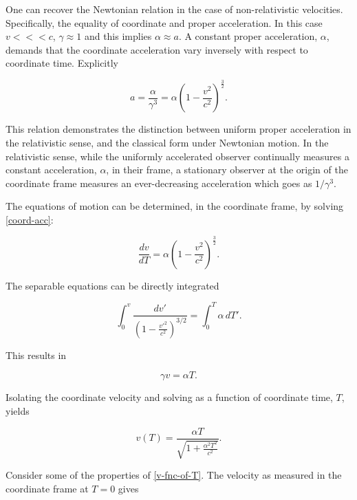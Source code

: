 \documentclass[11pt]{article}
\begin{document}
One can recover the Newtonian relation in the case of non-relativistic velocities. Specifically, the equality of coordinate and proper acceleration. In this case $v <<< c$, $\gamma \approx 1$ and this implies $\alpha \approx a$. A constant proper acceleration, $\alpha$, demands that the coordinate acceleration vary inversely with respect to coordinate time. Explicitly

\begin{equation}
    \label{coord-acc}
    a = \frac{\alpha}{\gamma^3} = \alpha \left( 1 - \frac{v^2}{c^2} \right)^{\frac{3}{2}}.
\end{equation}

This relation demonstrates the distinction between uniform proper acceleration in the relativistic sense, and the classical form under Newtonian motion. In the relativistic sense, while the uniformly accelerated observer continually measures a constant acceleration, $\alpha$, in their frame, a stationary observer at the origin of the coordinate frame measures an ever-decreasing acceleration which goes as $1/\gamma^3$.

The equations of motion can be determined, in the coordinate frame, by solving \eqref{coord-acc}:

\begin{equation}
    \label{diff-eq-coord-acc}
    \frac{dv}{dT} = \alpha \left( 1 - \frac{v^2}{c^2} \right)^{\frac{3}{2}}.
\end{equation}

The separable equations can be directly integrated

\begin{equation}
    \label{separable-eq-vel-T}
    \int_0^v \frac{dv'}{\left(1-\frac{v'^2}{c^2}\right)^{3/2}} = \int_0^T\alpha\,dT'.
\end{equation}

This results in 

\begin{equation}
    \label{separable-eq-vel-T-resukt}
    \gamma v = \alpha T.
\end{equation}

Isolating the coordinate velocity and solving as a function of coordinate time, $T$, yields

\begin{equation}
    \label{v-fnc-of-T}
    v(T) = \frac{\alpha T}{\sqrt{1 + \frac{\alpha^2 T^2}{c^2}}}.
\end{equation}

Consider some of the properties of \eqref{v-fnc-of-T}. The velocity as measured in the coordinate frame at $T = 0$ gives
\end{document}
